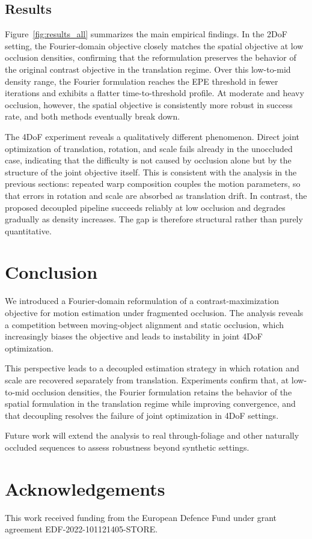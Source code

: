 \documentclass{article}
\begin{document}
\subsection{Results}
Figure~\ref{fig:results_all} summarizes the main empirical findings. In the 2DoF setting, the Fourier-domain objective closely matches the spatial objective at low occlusion densities, confirming that the reformulation preserves the behavior of the original contrast objective in the translation regime. Over this low-to-mid density range, the Fourier formulation reaches the EPE threshold in fewer iterations and exhibits a flatter time-to-threshold profile. At moderate and heavy occlusion, however, the spatial objective is consistently more robust in success rate, and both methods eventually break down.

The 4DoF experiment reveals a qualitatively different phenomenon. Direct joint optimization of translation, rotation, and scale fails already in the unoccluded case, indicating that the difficulty is not caused by occlusion alone but by the structure of the joint objective itself. This is consistent with the analysis in the previous sections: repeated warp composition couples the motion parameters, so that errors in rotation and scale are absorbed as translation drift. In contrast, the proposed decoupled pipeline succeeds reliably at low occlusion and degrades gradually as density increases. The gap is therefore structural rather than purely quantitative.

\section{Conclusion}
We introduced a Fourier-domain reformulation of a contrast-maximization objective for motion estimation under fragmented occlusion. The analysis reveals a competition between moving-object alignment and static occlusion, which increasingly biases the objective and leads to instability in joint 4DoF optimization.

This perspective leads to a decoupled estimation strategy in which rotation and scale are recovered separately from translation. Experiments confirm that, at low-to-mid occlusion densities, the Fourier formulation retains the behavior of the spatial formulation in the translation regime while improving convergence, and that decoupling resolves the failure of joint optimization in 4DoF settings. 

Future work will extend the analysis to real through-foliage and other naturally occluded sequences to assess robustness beyond synthetic settings.

\section*{Acknowledgements}
This work received funding from the European Defence Fund under grant agreement EDF-2022-101121405-STORE.



\end{document}

